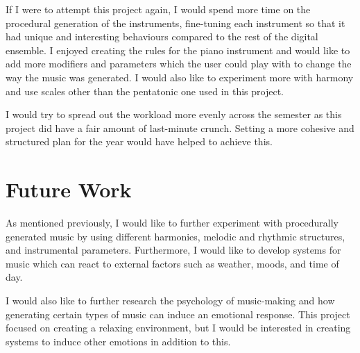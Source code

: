 If I were to attempt this project again, I would spend more time on the procedural generation of the instruments, fine-tuning each instrument so that it had unique and interesting behaviours compared to the rest of the digital ensemble. I enjoyed creating the rules for the piano instrument and would like to add more modifiers and parameters which the user could play with to change the way the music was generated. I would also like to experiment more with harmony and use scales other than the pentatonic one used in this project.

I would try to spread out the workload more evenly across the semester as this project did have a fair amount of last-minute crunch. Setting a more cohesive and structured plan for the year would have helped to achieve this.


\section{Future Work}
As mentioned previously, I would like to further experiment with procedurally generated music by using different harmonies, melodic and rhythmic structures, and instrumental parameters. Furthermore, I would like to develop systems for music which can react to external factors such as weather, moods, and time of day.

I would also like to further research the psychology of music-making and how generating certain types of music can induce an emotional response. This project focused on creating a relaxing environment, but I would be interested in creating systems to induce other emotions in addition to this.
